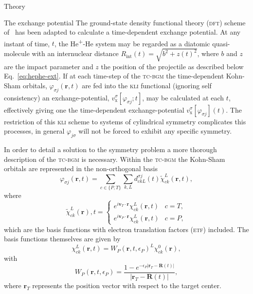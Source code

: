 \documentclass[aps, pra, reprint, groupedaddress, amsfonts,
               amsmath, amssymb, showpacs, nofootinbib]{revtex4-1}
\begin{document}
\begin{section}{Theory \label{sec:theory}}
\begin{subsection}{The exchange potential \label{sec:xpot}}
      The ground-state density functional theory (\textsc{dft}) scheme of~\cite{diamol} has been adapted
      to calculate a time-dependent exchange potential. At any instant of time, $t$, the
      He\textsuperscript{+}-He system may be regarded as a diatomic quasi-molecule with an internuclear
      distance $R_\mathrm{int}(t) = \sqrt{b^2 + z(t)^2}$, where $b$ and $z$ are the impact parameter and
      $z$ the position of the projectile as described below Eq.~\eqref{eq:hephe-ext}. If at each
      time-step of the \textsc{tc-bgm} the time-dependent Kohn-Sham orbitals,
      $\varphi_{\sigma j}(\mathbf{r},t)$ are fed into the \textsc{kli} functional (ignoring self
      consistency) an exchange-potential, $v^{\sigma}_\mathrm{x}[\varphi_{\sigma j};t]$, may be
      calculated at each $t$, effectively giving one the time-dependent exchange-potential
      $v^{\sigma}_\mathrm{x}[\varphi_{\sigma j}](t)$. The restriction of this \textsc{kli} scheme to
      systems of cylindrical symmetry complicates this processes, in general $\varphi_{j \sigma}$ will
      not be forced to exhibit any specific symmetry.
      
      In order to detail a solution to the symmetry problem a more thorough description of the
      \textsc{tc-bgm} is necessary. Within the \textsc{tc-bgm} the Kohn-Sham orbitals are represented in
      the non-orthogonal basis
      \begin{equation} \label{eq:bgmexp}
         \varphi_{\sigma j}(\mathbf{r},t) = \sum\limits_{c \in \{P, T\}} \sum\limits_{k, L}
                               d_{c k L}^{\sigma j}(t) \tilde{\chi}^{L}_{c k}(\mathbf{r},t),
      \end{equation}
      where
      \begin{equation} \label{eq:etfbasis}
         \tilde{\chi}^{L}_{ck}(\mathbf{r}),t =
            \begin{cases}
               e^{i \mathbf{v}_T \cdot \mathbf{r}} {\chi}^{L}_{c k}(\mathbf{r},t) & c = T, \\[2ex]
               e^{i \mathbf{v}_P \cdot \mathbf{r}} {\chi}^{L}_{c k}(\mathbf{r},t) & c = P,
            \end{cases}
      \end{equation}
      which are the basis functions with electron translation factors (\textsc{etf}) included. The basis
      functions themselves are given by
      \begin{equation} \label{eq:bgmbasis}
         \chi^{L}_{ck} (\mathbf{r},t)
         = W_P( \mathbf{r},t, \epsilon_P)^L \chi^{0}_{ck} (\mathbf{r}),
      \end{equation}
      with
      \begin{equation}
         W_P (\mathbf{r},t,\epsilon_P)
         = \frac{1 - e^{-\epsilon_P|\mathbf{r}_T - \mathbf{R}(t)|}}{|\mathbf{r}_T - \mathbf{R}(t)|},
      \end{equation}
      where $\mathbf{r}_T$ represents the position vector with respect to the target center.
      

\end{subsection}
\end{section}
\end{document}
